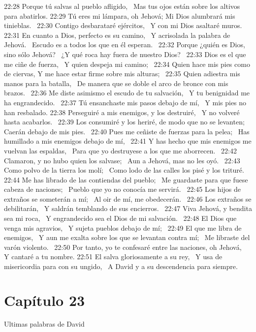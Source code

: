 22:28 Porque tú salvas al pueblo afligido,  
Mas tus ojos están sobre los altivos para abatirlos. 
22:29 Tú eres mi lámpara, oh Jehová; 
Mi Dios alumbrará mis tinieblas.  
22:30 Contigo desbarataré ejércitos,  
Y con mi Dios asaltaré muros.  
22:31 En cuanto a Dios, perfecto es su camino,  
Y acrisolada la palabra de Jehová.  
Escudo es a todos los que en él esperan.  
22:32 Porque ¿quién es Dios, sino sólo Jehová?  
¿Y qué roca hay fuera de nuestro Dios?  
22:33 Dios es el que me ciñe de fuerza,  
Y quien despeja mi camino;  
22:34 Quien hace mis pies como de ciervas, 
Y me hace estar firme sobre mis alturas;  
22:35 Quien adiestra mis manos para la batalla,  
De manera que se doble el arco de bronce con mis brazos.  
22:36 Me diste asimismo el escudo de tu salvación,  
Y tu benignidad me ha engrandecido.  
22:37 Tú ensanchaste mis pasos debajo de mí,  
Y mis pies no han resbalado. 
22:38 Perseguiré a mis enemigos, y los destruiré,  
Y no volveré hasta acabarlos.  
22:39 Los consumiré y los heriré, de modo que no se levanten;  
Caerán debajo de mis pies.  
22:40 Pues me ceñiste de fuerzas para la pelea;  
Has humillado a mis enemigos debajo de mí,  
22:41 Y has hecho que mis enemigos me vuelvan las espaldas,  
Para que yo destruyese a los que me aborrecen.  
22:42 Clamaron, y no hubo quien los salvase;  
Aun a Jehová, mas no les oyó.  
22:43 Como polvo de la tierra los molí;  
Como lodo de las calles los pisé y los trituré.  
22:44 Me has librado de las contiendas del pueblo;  
Me guardaste para que fuese cabeza de naciones;  
Pueblo que yo no conocía me servirá.  
22:45 Los hijos de extraños se someterán a mí;  
Al oir de mí, me obedecerán.  
22:46 Los extraños se debilitarán,  
Y saldrán temblando de sus encierros.  
22:47 Viva Jehová, y bendita sea mi roca,  
Y engrandecido sea el Dios de mi salvación.  
22:48 El Dios que venga mis agravios,  
Y sujeta pueblos debajo de mí;  
22:49 El que me libra de enemigos,  
Y aun me exalta sobre los que se levantan contra mí;  
Me libraste del varón violento.  
22:50 Por tanto, yo te confesaré entre las naciones, oh Jehová,  
Y cantaré a tu nombre. 
22:51 El salva gloriosamente a su rey,  
Y usa de misericordia para con su ungido,  
A David y a su descendencia para siempre.  
\section*{Capítulo 23 }
Ultimas palabras de David  

